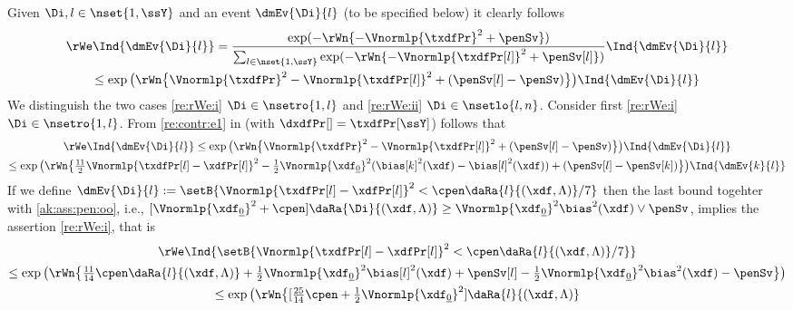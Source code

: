 \begin{pro}
  Given $\Di,l\in\nset{1,\ssY}$ and an event $\dmEv{\Di}{l}$ (to be
  specified below) it clearly follows
  \begin{multline}\label{re:rWe:pro1}
    \rWe\Ind{\dmEv{\Di}{l}}
    =\frac{\exp(-\rWn\{-\Vnormlp{\txdfPr}^2+\penSv\})}
    {\sum_{l\in\nset{1,\ssY}}\exp(-\rWn\{-\Vnormlp{\txdfPr[l]}^2+\penSv[l]\})}\Ind{\dmEv{\Di}{l}}\\
    \leq
    \exp\big(\rWn\big\{\Vnormlp{\txdfPr}^2-\Vnormlp{\txdfPr[l]}^2+(\penSv[l]-\penSv)\big\}\big)\Ind{\dmEv{\Di}{l}}
  \end{multline}
  We distinguish the two cases \ref{re:rWe:i} $\Di\in\nsetro{1,l}$ and \ref{re:rWe:ii}
  $\Di\in\nsetlo{l,n}$.  Consider first \ref{re:rWe:i} $\Di\in\nsetro{1,l}$. From
  \ref{re:contr:e1} in  (with
  $\dxdfPr[]=\txdfPr[\ssY]$) follows that
  \begin{multline*}%
    \rWe\Ind{\dmEv{\Di}{l}}
    \leq
    \exp\big(\rWn\big\{\Vnormlp{\txdfPr}^2-\Vnormlp{\txdfPr[l]}^2+(\penSv[l]-\penSv)\big\}\big)\Ind{\dmEv{\Di}{l}}\\
    \leq \exp\big(\rWn\big\{\tfrac{11}{2}\Vnormlp{\txdfPr[l]-\xdfPr[l]}^2-\tfrac{1}{2}\Vnormlp{\xdf_{\underline{0}}}^2(\bias[k]^2(\xdf)-\bias[l]^2(\xdf))+(\penSv[l]-\penSv[k])\big\}\big)\Ind{\dmEv{k}{l}}
  \end{multline*}
  If we define
  $\dmEv{\Di}{l}:=\setB{\Vnormlp{\txdfPr[l]-\xdfPr[l]}^2<\cpen\daRa{l}{(\xdf,\Lambda)}/7}$
  then the last bound togehter with \ref{ak:ass:pen:oo}, i.e.,
  $[\Vnormlp{\xdf_{\underline{0}}}^2+\cpen]\daRa{\Di}{(\xdf,\Lambda)}\geq
  \Vnormlp{\xdf_{\underline{0}}}^2\bias^2(\xdf)\vee\penSv$, implies the
  assertion \ref{re:rWe:i}, that is
  \begin{multline*}
    \rWe\Ind{\setB{\Vnormlp{\txdfPr[l]-\xdfPr[l]}^2<\cpen\daRa{l}{(\xdf,\Lambda)}/7}}
    \\\leq\exp\big(\rWn\big\{\tfrac{11}{14}\cpen\daRa{l}{(\xdf,\Lambda)}
    +\tfrac{1}{2}\Vnormlp{\xdf_{\underline{0}}}^2\bias[l]^2(\xdf) +\penSv[l]
    -\tfrac{1}{2}\Vnormlp{\xdf_{\underline{0}}}^2\bias^2(\xdf)-\penSv\big\}\big)\\
    \leq\exp\big(\rWn\big\{[\tfrac{25}{14}\cpen+\tfrac{1}{2}\Vnormlp{\xdf_{\underline{0}}}^2]\daRa{l}{(\xdf,\Lambda)}

\end{multline*}
\end{pro}
